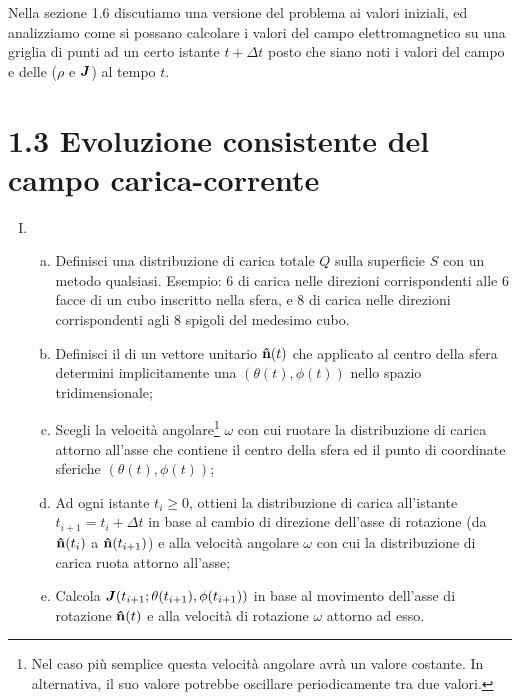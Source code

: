Nella sezione 1.6 discutiamo una versione  del problema ai valori iniziali, ed analizziamo come si possano calcolare i valori del campo elettromagnetico su una griglia di punti ad un certo istante $t+\Delta t$ posto che siano noti i valori del campo e delle  ($\rho$ e $\vb*{J}$) al tempo $t$. 

\section*{1.3 Evoluzione consistente del campo carica-corrente}\label{sec_1.3}
\begin{enumerate}[(I)]
\item {}  
	\begin{enumerate}[(a)]
	\item Definisci una distribuzione di carica totale $Q$ sulla superficie $S$ con un metodo qualsiasi. Esempio: 6  di carica  nelle direzioni corrispondenti alle 6 facce di un cubo inscritto nella sfera, e 8  di carica  nelle direzioni corrispondenti agli 8 spigoli del medesimo cubo.  
	\item Definisci il  di un vettore unitario $\vu{n}(t)$ che applicato al centro della sfera determini implicitamente una  $(\theta(t), \phi(t))$ nello spazio tridimensionale; 
	\item Scegli la velocità angolare\footnote{Nel caso più semplice questa velocità angolare avrà un valore costante. In alternativa, il suo valore potrebbe oscillare periodicamente tra due valori.} $\omega$ con cui ruotare la distribuzione di carica attorno all'asse che contiene il centro della sfera ed il punto di coordinate sferiche 
$(\theta(t), \phi(t))$;
	\item Ad ogni istante $t_i \geq 0$, ottieni la distribuzione di carica all'istante $t_{i+1} = t_i + \Delta t$ in base al cambio di direzione dell'asse di rotazione (da $\vu{n}(t_i)$ a $\vu{n}(t_{i+1})$) e alla velocità angolare $\omega$ con cui la distribuzione di carica ruota attorno all'asse;
	\item Calcola $\vb*{J}(t_{i+1}; \theta(t_{i+1}), \phi(t_{i+1}) )$  in base al movimento dell'asse di rotazione $\vu{n}(t)$ e alla velocità di rotazione $\omega$ attorno ad esso.
	\end{enumerate}

\end{enumerate}
